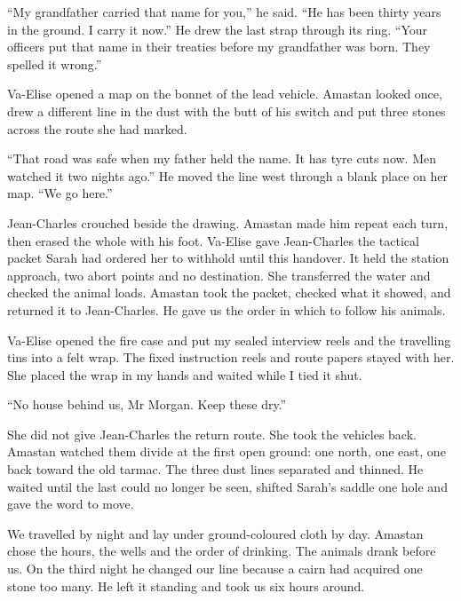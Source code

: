 ``My grandfather carried that name for you,'' he said. ``He has been thirty years in the ground. I carry it now.'' He drew the last strap through its ring. ``Your officers put that name in their treaties before my grandfather was born. They spelled it wrong.''\par

Va-Elise opened a map on the bonnet of the lead vehicle. Amastan looked once, drew a different line in the dust with the butt of his switch and put three stones across the route she had marked.\par

``That road was safe when my father held the name. It has tyre cuts now. Men watched it two nights ago.'' He moved the line west through a blank place on her map. ``We go here.''\par

Jean-Charles crouched beside the drawing. Amastan made him repeat each turn, then erased the whole with his foot. Va-Elise gave Jean-Charles the tactical packet Sarah had ordered her to withhold until this handover. It held the station approach, two abort points and no destination. She transferred the water and checked the animal loads. Amastan took the packet, checked what it showed, and returned it to Jean-Charles. He gave us the order in which to follow his animals.\par

Va-Elise opened the fire case and put my sealed interview reels and the travelling tins into a felt wrap. The fixed instruction reels and route papers stayed with her. She placed the wrap in my hands and waited while I tied it shut.\par

``No house behind us, Mr Morgan. Keep these dry.''\par

She did not give Jean-Charles the return route. She took the vehicles back. Amastan watched them divide at the first open ground: one north, one east, one back toward the old tarmac. The three dust lines separated and thinned. He waited until the last could no longer be seen, shifted Sarah's saddle one hole and gave the word to move.\par

We travelled by night and lay under ground-coloured cloth by day. Amastan chose the hours, the wells and the order of drinking. The animals drank before us. On the third night he changed our line because a cairn had acquired one stone too many. He left it standing and took us six hours around.\par

